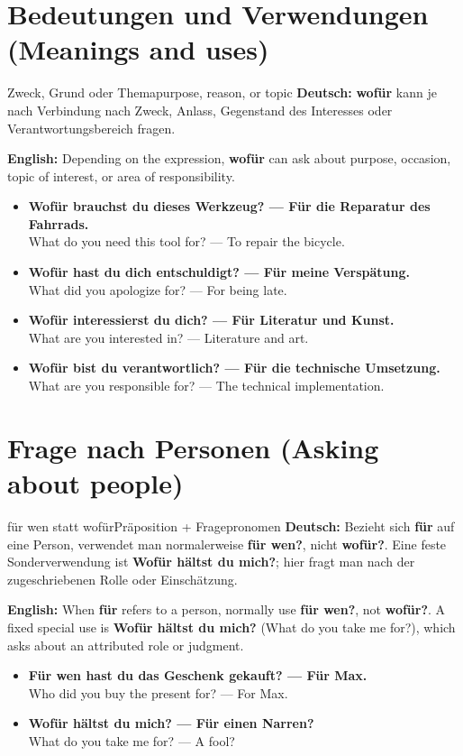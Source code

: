\documentclass[a4paper,11pt]{article}
\newcommand{\GermanText}[1]{\textbf{Deutsch: }#1\par}
\newcommand{\EnglishText}[1]{{\small\color{SoftGray}\textbf{English: }#1\par}}
\newcommand{\ExampleItem}[2]{\item \textbf{#1}\\{\small\color{SoftGray}#2}}
\begin{document}
\section{Bedeutungen und Verwendungen (Meanings and uses)}
\begin{grammarentry}{Zweck, Grund oder Thema}{purpose, reason, or topic}
\GermanText{\textbf{wofür} kann je nach Verbindung nach Zweck, Anlass, Gegenstand des Interesses oder Verantwortungsbereich fragen.}
\EnglishText{Depending on the expression, \textbf{wofür} can ask about purpose, occasion, topic of interest, or area of responsibility.}
\end{grammarentry}
\begin{exbox}\begin{itemize}
\ExampleItem{Wofür brauchst du dieses Werkzeug? — Für die Reparatur des Fahrrads.}{What do you need this tool for? — To repair the bicycle.}
\ExampleItem{Wofür hast du dich entschuldigt? — Für meine Verspätung.}{What did you apologize for? — For being late.}
\ExampleItem{Wofür interessierst du dich? — Für Literatur und Kunst.}{What are you interested in? — Literature and art.}
\ExampleItem{Wofür bist du verantwortlich? — Für die technische Umsetzung.}{What are you responsible for? — The technical implementation.}
\end{itemize}\end{exbox}

\section{Frage nach Personen (Asking about people)}
\begin{grammarentry}{für wen statt wofür}{Präposition + Fragepronomen}
\GermanText{Bezieht sich \textbf{für} auf eine Person, verwendet man normalerweise \textbf{für wen?}, nicht \textbf{wofür?}. Eine feste Sonderverwendung ist \textbf{Wofür hältst du mich?}; hier fragt man nach der zugeschriebenen Rolle oder Einschätzung.}
\EnglishText{When \textbf{für} refers to a person, normally use \textbf{für wen?}, not \textbf{wofür?}. A fixed special use is \textbf{Wofür hältst du mich?} (What do you take me for?), which asks about an attributed role or judgment.}
\end{grammarentry}
\begin{exbox}\begin{itemize}
\ExampleItem{Für wen hast du das Geschenk gekauft? — Für Max.}{Who did you buy the present for? — For Max.}
\ExampleItem{Wofür hältst du mich? — Für einen Narren?}{What do you take me for? — A fool?}
\end{itemize}\end{exbox}
\end{document}
